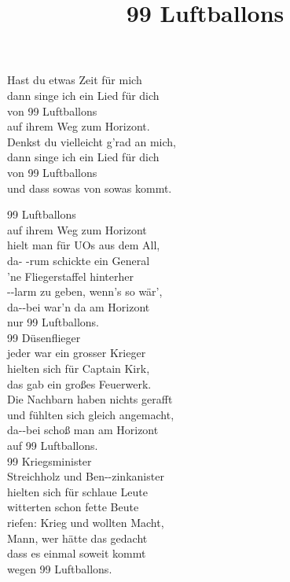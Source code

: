\title{99 Luftballons} 




\begin{enumerate}
\verse {} Hast du etwas  Zeit für mich \\ 
dann  singe ich ein  Lied für dich \\ 
von  99  Luftballons \\ 
auf  ihrem Weg zum  Horizont. \\ 
 Denkst du vielleicht  g’rad an mich, \\ 
dann  singe ich ein  Lied für dich \\ 
von  99  Luftballons \\ 
und  dass sowas von  sowas kommt. 




\verse {} 99  Luftballons \\ 
auf  ihrem Weg zum  Horizont \\ 
hielt  man für UOs  aus dem All, \\ 
da- -rum schickte ein General \\ 
’ne  Fliegerstaffel  hinterher \\ 
--larm zu geben,  wenn’s so wär’, \\ 
da--bei war’n da am  Horizont \\ 
nur  99  Luftballons. \\ 




\verse {} 99  Düsenflieger \\ 
 jeder war ein  grosser Krieger \\ 
 hielten sich für  Captain Kirk, \\ 
das  gab ein großes  Feuerwerk. \\ 
Die  Nachbarn haben  nichts gerafft \\ 
und  fühlten sich gleich  angemacht, \\ 
da--bei schoß man am  Horizont \\ 
auf  99  Luftballons. \\ 




\verse {} 99  Kriegsminister \\ 
 Streichholz und Ben--zinkanister \\ 
 hielten sich für  schlaue Leute \\ 
 witterten schon  fette Beute \\ 
 riefen: Krieg und  wollten Macht, \\ 
 Mann, wer hätte  das gedacht \\ 
 dass es einmal  soweit kommt \\ 
wegen  99  Luftballons. \\ 





\end{enumerate}
